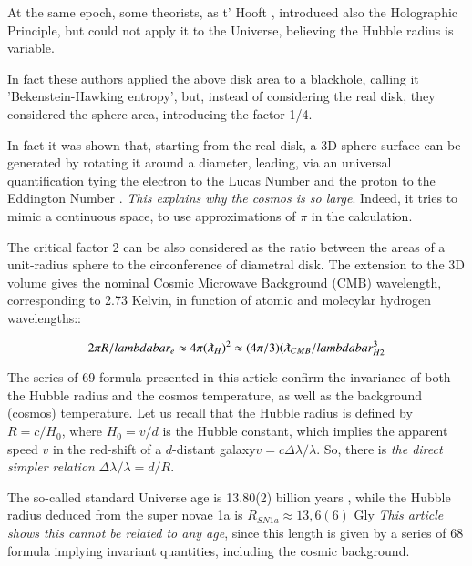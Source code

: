 \documentclass[a4paper,9pt]{article}
\begin{document}
    At the same epoch, some theorists, as t' Hooft \cite{Hooft}, introduced also the Holographic Principle, but could not apply it to the Universe, believing the Hubble radius is variable.
    
    
    In fact these authors applied the above disk area to a blackhole, calling it 'Bekenstein-Hawking entropy'\cite{Bekenstein}, but, instead of considering the real disk, they considered the sphere area, introducing the factor 1/4. 
    
    
    In fact it was shown that, starting from the real disk, a 3D sphere surface can be generated by rotating it around a diameter, leading, via an universal quantification tying the electron to the Lucas Number and the proton to the Eddington Number \cite{Sanchez}. \textit {This explains why the cosmos is so large}. Indeed, it tries to mimic a continuous space, to use approximations of $\pi$ in  the calculation.
    
    The critical factor 2 can be also considered as the ratio between the areas of a unit-radius sphere to the circonference of diametral disk. The extension to the 3D volume gives the nominal Cosmic Microwave Background (CMB) wavelength, corresponding to 2.73 Kelvin, in function of atomic and molecylar hydrogen wavelengths:\cite{Sanchez}:
    
    \begin{equation}
        2\pi R/lambdabar_e \approx 4\pi (\lambdabar_H)^2 \approx (4\pi/3) (\lambdabar_{CMB}/lambdabar_{H2}^3
    \end{equation}

    The series of 69 formula presented in this article confirm the invariance of both the Hubble radius and the cosmos temperature, as well as the background (cosmos) temperature. Let us recall that the Hubble radius is defined by $R = c/H_0$, where $H_0 = v/d$ is the Hubble constant, which implies the apparent speed $v$ in the red-shift of a $d$-distant galaxy$ v = c \Delta \lambda/\lambda$. So, there is \textit {the direct simpler relation} $\Delta \lambda/\lambda =  d/R$. 
    

    
    The so-called standard Universe age is 13.80(2) billion years \cite{Tanabashi}, while the Hubble radius deduced from the super novae 1a is $R_{SN1a} \approx 13,6(6)$ Gly \cite{Freeman}\textit{This article shows this cannot be related to any age}, since this length is given by a series of 68 formula implying invariant quantities, including the cosmic background. 
    
\end{document}
